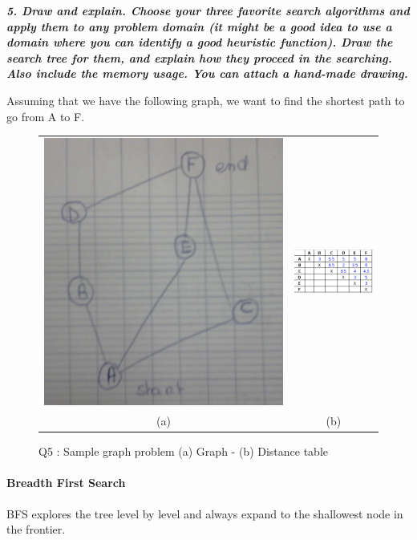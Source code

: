 \newpage
\thispagestyle{empty}

\textit{\textbf{5. Draw and explain. Choose your three favorite search algorithms and apply them to any problem domain (it might be a good idea to use a domain where you can identify a good heuristic function). Draw the search tree for them, and explain how they proceed in the searching. Also include the memory usage. You can attach a hand-made drawing.}}

Assuming that we have the following graph, we want to find the shortest path to go
from A to F.

\begin{figure}[h]
    \centering
    \begin{tabular}{cc}
      \includegraphics[width=.38\linewidth,scale=1]{./images/graph.jpg} & \includegraphics[width=.36\linewidth, scale=1.5]{./images/table.png} \\
      \hspace{0.5cm} (a) & \hspace{0.5cm} (b)
    \end{tabular}
    \caption{Q5 : Sample graph problem (a) Graph - (b) Distance table \label{fig:Graph and table}}
\end{figure}

\paragraph{Breadth First Search}

BFS explores the tree level by level and always expand to the shallowest
node in the frontier.

